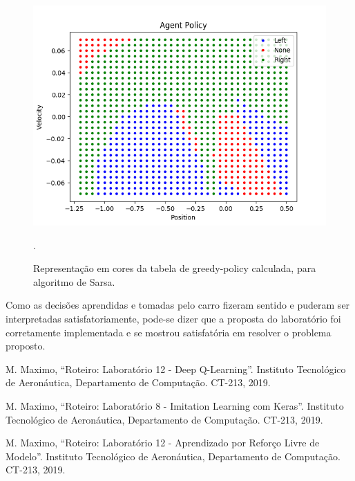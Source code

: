 \documentclass[conference]{IEEEtran}
\begin{document}
\begin{figure}[htbp]
\centering
\centerline{\includegraphics[scale=0.5]{imagens/agent_decision.png}}
\caption{Representação em cores da tabela de greedy-policy calculada, para algoritmo de Sarsa.}.
\label{agent_decision}
\end{figure} 

Como as decisões aprendidas e tomadas pelo carro fizeram sentido e puderam ser interpretadas satisfatoriamente, pode-se dizer que a proposta do laboratório foi corretamente implementada e se mostrou satisfatória em resolver o problema proposto.
	
\begin{thebibliography}{00}
 M. Maximo, ``Roteiro: Laboratório 12 - Deep Q-Learning''. Instituto Tecnológico de Aeronáutica, Departamento de Computação. CT-213, 2019.

 M. Maximo, ``Roteiro: Laboratório 8 - Imitation Learning com Keras''. Instituto Tecnológico de Aeronáutica, Departamento de Computação. CT-213, 2019.

 M. Maximo, ``Roteiro: Laboratório 12 - Aprendizado por Reforço Livre de Modelo''. Instituto Tecnológico de Aeronáutica, Departamento de Computação. CT-213, 2019.

\end{thebibliography}
\end{document}
